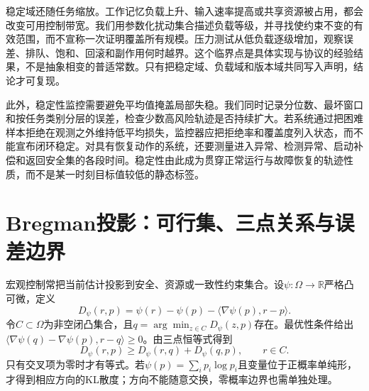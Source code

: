 稳定域还随任务缩放。工作记忆负载上升、输入速率提高或共享资源被占用，都会改变可用控制带宽。我们用参数化扰动集合描述负载等级，并寻找使约束不变的有效范围，而不宣称一次证明覆盖所有规模。压力测试从低负载逐级增加，观察误差、排队、饱和、回滚和副作用何时越界。这个临界点是具体实现与协议的经验结果，不是抽象相变的普适常数。只有把稳定域、负载域和版本域共同写入声明，结论才可复现。

此外，稳定性监控需要避免平均值掩盖局部失稳。我们同时记录分位数、最坏窗口和按任务类别分层的误差，检查少数高风险轨迹是否持续扩大。若系统通过把困难样本拒绝在观测之外维持低平均损失，监控器应把拒绝率和覆盖度列入状态，而不能宣布闭环稳定。对具有恢复动作的系统，还要测量进入异常、检测异常、启动补偿和返回安全集的各段时间。稳定性由此成为贯穿正常运行与故障恢复的轨迹性质，而不是某一时刻目标值较低的静态标签。

\section{Bregman投影：可行集、三点关系与误差边界}
\label{sec:section_1708}

宏观控制常把当前估计投影到安全、资源或一致性约束集合。设$\psi:\Omega\to\mathbb R$严格凸可微，定义
\begin{equation}
D_\psi(r,p)=\psi(r)-\psi(p)-\langle\nabla\psi(p),r-p\rangle.
\end{equation}
令$C\subset\Omega$为非空闭凸集合，且$q=\arg\min_{z\in C}D_\psi(z,p)$存在。最优性条件给出$\langle\nabla\psi(q)-\nabla\psi(p),r-q\rangle\ge0$。由三点恒等式得到
\begin{equation}
D_\psi(r,p)\ge D_\psi(r,q)+D_\psi(q,p),\qquad r\in C.
\end{equation}
只有交叉项为零时才有等式。若$\psi(p)=\sum_i p_i\log p_i$且变量位于正概率单纯形，才得到相应方向的KL散度；方向不能随意交换，零概率边界也需单独处理。

